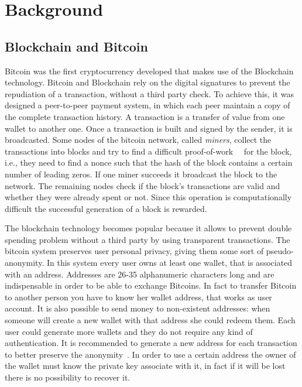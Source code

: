 \section{Background}
\subsection{Blockchain and Bitcoin}
Bitcoin was the first cryptocurrency developed that makes use of the
Blockchain technology. Bitcoin and Blockchain rely on the digital
signatures to prevent the repudiation of a transaction, without a third
party check.
To achieve this, it was designed a peer-to-peer payment system,
in which each peer maintain a copy of the complete transaction history.
A transaction is a transfer of value from one wallet to another one.
Once a transaction is built and signed by the sender, it is broadcasted.
Some nodes of the bitcoin network, called \textit{miners}, collect the
transactions into blocks and try to find a difficult
proof-of-work~\cite{pricing}~\cite{hashcash} for the
block, i.e., they need to find a nonce such that the hash of the block
contains a certain number of leading zeros.
If one miner succeeds it broadcast the block to the network.
The remaining nodes check if the block's transactions are valid and
whether they were already spent or not.
Since this operation is computationally difficult the successful
generation of a block is rewarded.

The blockchain technology becomes popular because it allows
to prevent double spending problem without a third party by using
transparent transactions.
The bitcoin system preserves user personal privacy, giving them some
sort of pseudo-anonymity.
In this system every user owns at least one wallet, that is associated
with an address. Addresses are 26-35 alphanumeric characters long and
are indispensable in order to be able to exchange Bitcoins.
In fact to transfer Bitcoin to another person you have to know her
wallet address, that works as user account.
It is also possible to send money to non-existent addresses: when
someone will create a new wallet with that address she could redeem
them.
Each user could generate more wallets and they do not require any kind
of authentication.
It is recommended to generate a new address for each transaction
to better preserve the anonymity~\cite{satoshi}.
In order to use a certain address the owner of the wallet must know
the private key associate with it, in fact if it
will be lost there is no possibility to recover it.


